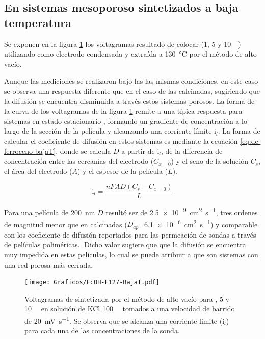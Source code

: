 	\subsection{En sistemas mesoporoso sintetizados a baja temperatura}

		Se exponen en la figura \ref{fig:fcoh_bajaT} los voltagramas resultado de colocar \fc\space (1, 5 y \SI{10}{\milli\Molar}) utilizando como electrodo \pdmF\space condensada y extraída a \SI{130}{\celsius} por el método de alto vacío. 
			
		Aunque las mediciones se realizaron bajo las las mismas condiciones, en este caso se observa una respuesta diferente que en el caso de las \pdmF\space calcinadas, sugiriendo que la difusión se encuentra disminuida a través estos sistemas porosos. La forma de la curva de los voltagramas de la figura \ref{fig:fcoh_bajaT} remite a una típica respuesta para sistemas en estado estacionario	, formando un gradiente de concentración a lo largo de la sección de la película y alcanzando una corriente límite $\text{i}_l$. 
		La forma de calcular el coeficiente de difusión en estos sistemas es mediante la ecuación \ref{eq:de-ferroceno-bajaT}, donde se calcula $D$ a partir de $\text{i}_l$, de la diferencia de concentración entre las cercanías del electrodo ($C_{x=0}$) y el seno de la solución $C_s$, el área del electrodo ($A$) y el espesor de la película ($L$).

			\begin{equation}
					\text{i}_l = \frac{nFAD(C_{s}-C_{x=0})}{L}
					\label{eq:de-ferroceno-bajaT}
			\end{equation}
			  	

		Para una película de \SI{200}{nm} $D$ resultó ser de \SI{2.5e-9}{\square\cm\per\second}, tres ordenes de magnitud menor que en \pdmF\space calcinadas ($D_{ap}$=\SI{6,1e-6}{\square\cm\per\second}) y comparable con los coeficiente de difusión reportados para las permeación de sondas a través de películas poliméricas.\cite{Kolb1993}. Dicho valor sugiere que que la difusión se encuentra muy impedida en estas películas, lo cual se puede atribuir a que son sistemas con una red porosa más cerrada. 
				
				\begin{figure}[ht!]
				\centering
		 	    \texttt{[image: Graficos/FcOH-F127-BajaT.pdf]}
		        \caption[Voltagrama para \fc\space en \pdm\space de baja temperatura]{Voltagramas de \pdmF\space sintetizada por el método de alto vacío para \fc{}, 5 y \SI{10}{\milli\Molar} en solución de KCl \SI{100}{\milli\Molar} tomados a una velocidad de barrido de \SI{20}{\milli\volt\per\second}. Se observa que se alcanza una corriente limite ($\text{i}_l$) para cada una de las concentraciones de la sonda.}
		        \label{fig:fcoh_bajaT}
		      	\end{figure}

